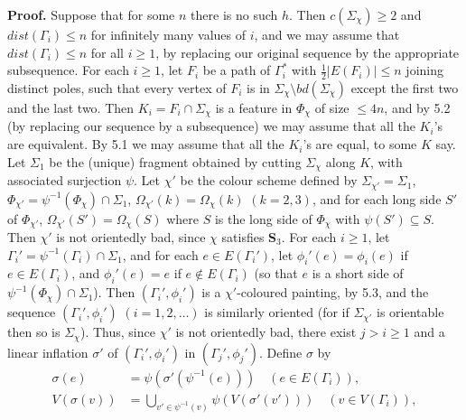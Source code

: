 \textbf{Proof.} Suppose that for some $n$ there is no such $h$. Then $c(\Sigma_\chi) \ge 2$ and $dist(\Gamma_i) \le n$ for infinitely many values of $i$, and we may assume that $dist(\Gamma_i) \le n$ for all $i \ge 1$, by replacing our original sequence by the appropriate subsequence. For each $i \ge 1$, let $F_i$ be a path of $\Gamma_i^*$ with $\frac{1}{2}|E(F_i)| \le n$ joining distinct poles, such that every vertex of $F_i$ is in $\Sigma_\chi \setminus bd(\Sigma_\chi)$ except the first two and the last two. Then $K_i = F_i \cap \Sigma_\chi$ is a feature in $\Phi_\chi$ of size $\le 4n$, and by 5.2 (by replacing our sequence by a subsequence) we may assume that all the $K_i$'s are equivalent. By 5.1 we may assume that all the $K_i$'s are equal, to some $K$ say.  Let $\Sigma_1$ be the (unique) fragment obtained by cutting $\Sigma_\chi$ along $K$, with associated surjection $\psi$. Let $\chi'$ be the colour scheme defined by $\Sigma_{\chi'} = \Sigma_1$, $\Phi_{\chi'} = \psi^{-1}(\Phi_\chi) \cap \Sigma_1$, $\Omega_{\chi'}(k) = \Omega_\chi(k)$ $(k = 2, 3)$, and for each long side $S'$ of $\Phi_{\chi'}$, $\Omega_{\chi'}(S') = \Omega_\chi(S)$ where $S$ is the long side of $\Phi_\chi$ with $\psi(S') \subseteq S$. Then $\chi'$ is not orientedly bad, since $\chi$ satisfies \textbf{S}$_3$. For each $i \ge 1$, let $\Gamma_i' = \psi^{-1}(\Gamma_i) \cap \Sigma_1$, and for each $e \in E(\Gamma_i')$, let $\phi_i'(e) = \phi_i(e)$ if $e \in E(\Gamma_i)$, and $\phi_i'(e) = e$ if $e \notin E(\Gamma_i)$ (so that $e$ is a short side of $\psi^{-1}(\Phi_\chi) \cap \Sigma_1$). Then $(\Gamma_i', \phi_i')$ is a $\chi'$-coloured painting, by 5.3, and the sequence $(\Gamma_i', \phi_i')$ $(i = 1, 2, \dots)$ is similarly oriented (for if $\Sigma_{\chi'}$ is orientable then so is $\Sigma_\chi$). Thus, since $\chi'$ is not orientedly bad, there exist $j > i \ge 1$ and a linear inflation $\sigma'$ of $(\Gamma_i', \phi_i')$ in $(\Gamma_j', \phi_j')$. Define $\sigma$ by
\begin{align*}
\sigma(e) &= \psi(\sigma'(\psi^{-1}(e))) \quad (e \in E(\Gamma_i)), \\
V(\sigma(v)) &= \bigcup_{v' \in \psi^{-1}(v)} \psi(V(\sigma'(v'))) \quad (v \in V(\Gamma_i)),
\end{align*}
